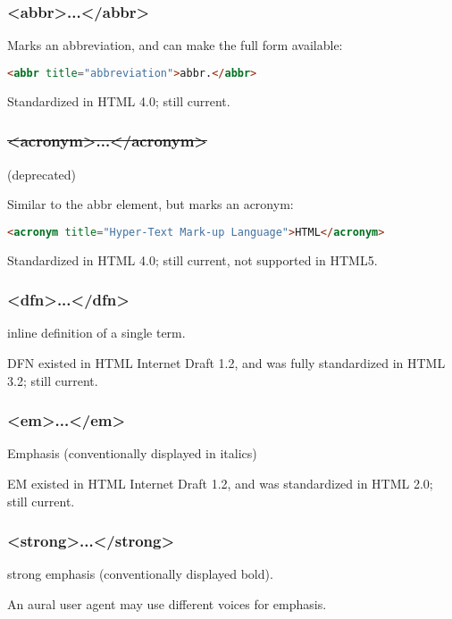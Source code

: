 \subsubsection{<abbr>...</abbr>}

Marks an abbreviation, and can make the full form available:

\begin{lstlisting}[language=HTML]
<abbr title="abbreviation">abbr.</abbr>
\end{lstlisting}

Standardized in HTML 4.0; still current.


\subsubsection{\sout{<acronym>...</acronym>}}

(deprecated)

Similar to the abbr element, but marks an acronym:

\begin{lstlisting}[language=HTML]
<acronym title="Hyper-Text Mark-up Language">HTML</acronym>
\end{lstlisting}

Standardized in HTML 4.0; still current, not supported in HTML5.

\subsubsection{<dfn>...</dfn>}


inline definition of a single term.

DFN existed in HTML Internet Draft 1.2, and was fully standardized in HTML 3.2; still current.


\subsubsection{<em>...</em>}


Emphasis (conventionally displayed in italics)

EM existed in HTML Internet Draft 1.2, and was standardized in HTML 2.0; still current.


\subsubsection{<strong>...</strong>}


strong emphasis (conventionally displayed bold).

An aural user agent may use different voices for emphasis.

